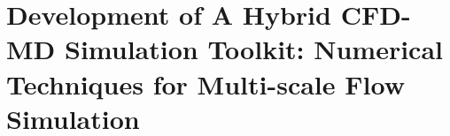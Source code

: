 \documentclass[preprint,12pt]{elsarticle}
\begin{document}





\section{Development of A Hybrid CFD-MD Simulation Toolkit: Numerical Techniques for Multi-scale Flow Simulation}
\end{document}
